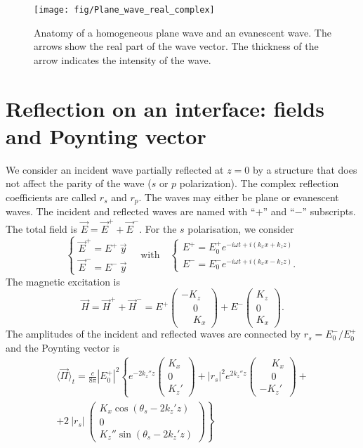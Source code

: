 \begin{figure}[h!]
\texttt{[image: fig/Plane\_wave\_real\_complex]}
\caption{\label{fig:Plane_wave_real_complex}Anatomy of a homogeneous plane wave and an evanescent wave. The arrows show the real part of the wave vector. The thickness of the arrow indicates the intensity of the wave.}
\end{figure}


\section{Reflection on an interface: fields and Poynting vector}

We consider an incident wave partially reflected at $z=0$ by a structure that does not affect the parity of the wave ($s$ or $p$ polarization).
The complex reflection coefficients are called $r_s$ and $r_p$.
The waves may either be plane or evanescent waves.
The incident and reflected waves are named with ``$+$'' and ``$-$'' subscripts.
The total field is $\vec E = \vec E^+ + \vec E^-$.
%
For the $s$ polarisation, we consider
$$
\left\{
\begin{array}{l}
\vec E^+ = E^+\ \vec y \\
\vec E^- = E^-\ \vec y
\end{array}
\right.
\quad\mathrm{with}\quad
\left\{
\begin{array}{l}
E^+ = E_0^+ e^{-i\omega t + i(k_x x + k_z z)}  \\
E^- = E_0^- e^{-i\omega t + i(k_x x - k_z z)}.
\end{array}
\right.
$$
The magnetic excitation is 
$$
\vec H = \vec H^+ + \vec H^- = 
E^+ 
\begin{pmatrix}
- K_z \\
\phantom{-} 0 \\
\phantom{-} K_x 
\end{pmatrix}
+
E^-
\begin{pmatrix}
K_z \\
0 \\
K_x 
\end{pmatrix}.
$$
The amplitudes of the incident and reflected waves are connected by $r_s = E_0^- / E_0^+$ and the Poynting vector is
\begin{align*}
\langle \vec{\Pi} \rangle_t = 
\frac{c}{8\pi} |E_0^+|^2 \left\{
e^{-2 k_z'' z} 
\begin{pmatrix}
K_x \\
0 \\
K_z'
\end{pmatrix}
+ 
|r_s|^2
e^{2 k_z'' z}
\begin{pmatrix}
\phantom{-} K_x \\
\phantom{-} 0 \\
-K_z'
\end{pmatrix}
+ \right.\\
\left. +
2\ |r_s|\ 
\begin{pmatrix}
K_x \cos(\theta_{s} - 2 k_z' z)\\
0 \\
K_z'' \sin(\theta_{s} - 2 k_z' z)
\end{pmatrix}
\right\}
\end{align*}

